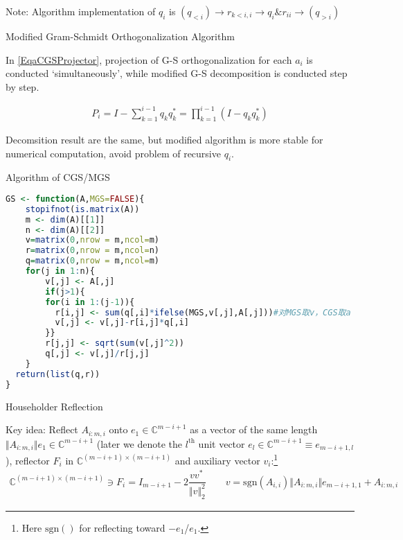     Note: Algorithm implementation of $ q_i $ is $ (q_{<i})\to r_{k<i,i}\to q_{i}\& r_{ii} \to (q_{>i}) $


\begin{point}
    Modified Gram-Schmidt Orthogonalization Algorithm
\end{point}

    In \autoref{EqaCGSProjector}, projection of G-S orthogonalization for each $ a_i $ is conducted `simultaneously', while modified G-S decomposition is conducted step by step.

\begin{align}
    P_i=I-\sum_{k=1}^{i-1}q_kq_k^*=\prod_{k=1}^{i-1}(I-q_kq_k^*) 
\end{align}
    
    Decomsition result are the same, but modified algorithm is more stable for numerical computation, avoid problem of recursive $ q_i $.


\begin{rcode}
    Algorithm of CGS/MGS
\begin{lstlisting}[language=R]
GS <- function(A,MGS=FALSE){
    stopifnot(is.matrix(A))
    m <- dim(A)[[1]]
    n <- dim(A)[[2]]
    v=matrix(0,nrow = m,ncol=m)
    r=matrix(0,nrow = m,ncol=n)
    q=matrix(0,nrow = m,ncol=m)
    for(j in 1:n){
        v[,j] <- A[,j]
        if(j>1){
        for(i in 1:(j-1)){
          r[i,j] <- sum(q[,i]*ifelse(MGS,v[,j],A[,j]))#对MGS取v，CGS取a
          v[,j] <- v[,j]-r[i,j]*q[,i]
        }}
        r[j,j] <- sqrt(sum(v[,j]^2))
        q[,j] <- v[,j]/r[j,j]
    }
  return(list(q,r))
}
\end{lstlisting}
\end{rcode}






\begin{point}
    \hypertarget{Householder-Reflection}{Householder Reflection}
\end{point}

    Key idea: Reflect $ A_{i:m,i} $ onto $ e_{1}\in\mathbb{C}^{m-i+1} $ as a vector of the same length $ \Vert  A_{i:m,i} \Vert e_{1}\in\mathbb{C}^{m-i+1} $ (later we denote the $ l^\mathrm{th}  $ unit vector $ e_{l}\in\mathbb{C}^{m-i+1}\equiv e_{m-i+1,l} $), reflector $ F_i $ in $ \mathbb{C}^{(m-i+1)\times (m-i+1)} $ and auxiliary vector $ v_i $:\footnote{Here $ \mathrm{sgn}() $ for reflecting toward $ -e_1 $/$ e_1 $.}
    \begin{align}
        \mathbb{C}^{(m-i+1)\times( m-i+1)} \ni F_i=I_{m-i+1}-2\dfrac{vv^*\,}{\Vert v \Vert_2^2 }\qquad v= \mathrm{sgn}(A_{i,i}) \Vert  A_{i:m,i} \Vert e_{m-i+1,1}+ A_{i:m,i} 
    \end{align}

